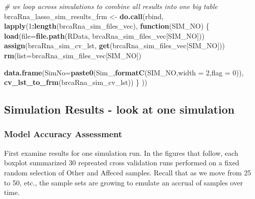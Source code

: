 \documentclass[
]{book}
\newenvironment{Shaded}{\begin{snugshade}}{\end{snugshade}}
\newcommand{\CommentTok}[1]{\textcolor[rgb]{0.56,0.35,0.01}{\textit{#1}}}
\newcommand{\ControlFlowTok}[1]{\textcolor[rgb]{0.13,0.29,0.53}{\textbf{#1}}}
\newcommand{\DataTypeTok}[1]{\textcolor[rgb]{0.13,0.29,0.53}{#1}}
\newcommand{\DecValTok}[1]{\textcolor[rgb]{0.00,0.00,0.81}{#1}}
\newcommand{\KeywordTok}[1]{\textcolor[rgb]{0.13,0.29,0.53}{\textbf{#1}}}
\newcommand{\NormalTok}[1]{#1}
\newcommand{\OperatorTok}[1]{\textcolor[rgb]{0.81,0.36,0.00}{\textbf{#1}}}
\newcommand{\StringTok}[1]{\textcolor[rgb]{0.31,0.60,0.02}{#1}}
\begin{document}
\begin{Shaded}
\begin{Highlighting}[]
\CommentTok{\# we loop across simulations to combine all results into one big table}
\NormalTok{brcaRna\_lasso\_sim\_results\_frm <{-}}\StringTok{ }\KeywordTok{do.call}\NormalTok{(}\StringTok{\textquotesingle{}rbind\textquotesingle{}}\NormalTok{, }\KeywordTok{lapply}\NormalTok{(}\DecValTok{1}\OperatorTok{:}\KeywordTok{length}\NormalTok{(brcaRna\_sim\_files\_vec),}
 \ControlFlowTok{function}\NormalTok{(SIM\_NO) \{}
  \KeywordTok{load}\NormalTok{(}\DataTypeTok{file=}\KeywordTok{file.path}\NormalTok{(}\StringTok{\textquotesingle{}RData\textquotesingle{}}\NormalTok{, brcaRna\_sim\_files\_vec[SIM\_NO]))}
  \KeywordTok{assign}\NormalTok{(}\StringTok{\textquotesingle{}brcaRna\_sim\_cv\_lst\textquotesingle{}}\NormalTok{, }\KeywordTok{get}\NormalTok{(brcaRna\_sim\_files\_vec[SIM\_NO]))}
  \KeywordTok{rm}\NormalTok{(}\DataTypeTok{list=}\NormalTok{brcaRna\_sim\_files\_vec[SIM\_NO])}
  
  \KeywordTok{data.frame}\NormalTok{(}\DataTypeTok{SimNo=}\KeywordTok{paste0}\NormalTok{(}\StringTok{\textquotesingle{}Sim\_\textquotesingle{}}\NormalTok{,}\KeywordTok{formatC}\NormalTok{(SIM\_NO,}\DataTypeTok{width =} \DecValTok{2}\NormalTok{,}\DataTypeTok{flag =} \DecValTok{0}\NormalTok{)), }\KeywordTok{cv\_lst\_to\_frm}\NormalTok{(brcaRna\_sim\_cv\_lst))}
\NormalTok{\} }
\NormalTok{)) }
\end{Highlighting}
\end{Shaded}

\hypertarget{simulation-results---look-at-one-simulation-1}{%
\subsection{Simulation Results - look at one simulation}\label{simulation-results---look-at-one-simulation-1}}

\hypertarget{model-accuracy-assessment-2}{%
\subsubsection{Model Accuracy Assessment}\label{model-accuracy-assessment-2}}

First examine results for one simulation run. In the figures that follow,
each boxplot summarized 30 repreated cross validation runs performed on a
fixed random selection of Other and Affeced samples. Recall that as
we move from 25 to 50, etc., the sample sets are growing to emulate an
accrual of samples over time.
\end{document}
